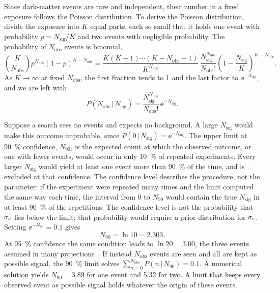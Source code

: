 Since dark-matter events are rare and independent, their number in a fixed exposure follows the Poisson distribution. To derive the Poisson distribution, divide the exposure into $K$ equal parts, each so small that it holds one event with probability $p = N_{\mathrm{sig}}/K$ and two events with negligible probability. The probability of $N_{\mathrm{obs}}$ events is binomial,
\begin{equation*}
  \binom{K}{N_{\mathrm{obs}}} p^{N_{\mathrm{obs}}}(1-p)^{K-N_{\mathrm{obs}}}
  = \frac{K(K-1)\cdots(K-N_{\mathrm{obs}}+1)}{K^{N_{\mathrm{obs}}}}\,\frac{N_{\mathrm{sig}}^{N_{\mathrm{obs}}}}{N_{\mathrm{obs}}!}\left(1-\frac{N_{\mathrm{sig}}}{K}\right)^{K-N_{\mathrm{obs}}} .
\end{equation*}
As $K \to \infty$ at fixed $N_{\mathrm{obs}}$, the first fraction tends to 1 and the last factor to $\ee^{-N_{\mathrm{sig}}}$, and we are left with
\begin{equation}
  P(N_{\mathrm{obs}}\,|\,N_{\mathrm{sig}}) = \frac{N_{\mathrm{sig}}^{N_{\mathrm{obs}}}}{N_{\mathrm{obs}}!}\,\ee^{-N_{\mathrm{sig}}} .
  \label{eq:1.5-poisson}
\end{equation}

Suppose a search sees no events and expects no background. A large $N_{\mathrm{sig}}$ would make this outcome improbable, since $P(0\,|\,N_{\mathrm{sig}}) = \ee^{-N_{\mathrm{sig}}}$. The upper limit at \SI{90}{\percent} confidence, $N_{90}$, is the expected count at which the observed outcome, or one with fewer events, would occur in only \SI{10}{\percent} of repeated experiments. Every larger $N_{\mathrm{sig}}$ would yield at least one event more than \SI{90}{\percent} of the time, and is excluded at that confidence. The confidence level describes the procedure, not the parameter: if the experiment were repeated many times and the limit computed the same way each time, the interval from 0 to $N_{90}$ would contain the true $N_{\mathrm{sig}}$ in at least \SI{90}{\percent} of the repetitions. The confidence level is not the probability that $\bar{\sigma}_{e}$ lies below the limit; that probability would require a prior distribution for $\bar{\sigma}_{e}$. Setting $\ee^{-N_{90}} = 0.1$ gives
\begin{equation}
  N_{90} = \ln 10 = 2.303 .
  \label{eq:1.5-N90}
\end{equation}
At \SI{95}{\percent} confidence the same condition leads to $\ln 20 = 3.00$, the three events assumed in many projections~\cite[Sect.~V]{mitridate2021dark}. If instead $N_{\mathrm{obs}}$ events are seen and all are kept as possible signal, the \SI{90}{\percent} limit solves $\sum_{n=0}^{N_{\mathrm{obs}}} P(n\,|\,N_{90}) = 0.1$. A numerical solution yields $N_{90} = 3.89$ for one event and 5.32 for two. A limit that keeps every observed event as possible signal holds whatever the origin of these events.


